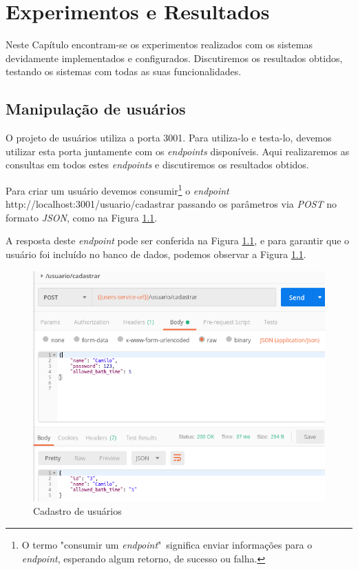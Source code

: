\chapter{Experimentos e Resultados}

Neste Capítulo encontram-se os experimentos realizados com os sistemas devidamente implementados e configurados. Discutiremos os resultados obtidos, testando os sistemas com todas as suas funcionalidades.

\section{Manipulação de usuários}

O projeto de usuários utiliza a porta 3001. Para utiliza-lo e testa-lo, devemos utilizar esta porta juntamente com os \textit{endpoints} disponíveis. Aqui realizaremos as consultas em todos estes \textit{endpoints} e discutiremos os resultados obtidos.

Para criar um usuário devemos consumir\footnote{O termo "consumir um \textit{endpoint}"\  significa enviar informações para o \textit{endpoint}, esperando algum retorno, de sucesso ou falha.} o \textit{endpoint} http://localhost:3001/usuario/cadastrar passando os parâmetros via \textit{POST} no formato \textit{JSON}, como na Figura \ref{fig:cadastro}.

A resposta deste \textit{endpoint} pode ser conferida na Figura \ref{fig:cadastro}, e para garantir que o usuário foi incluído no banco de dados, podemos observar a Figura \ref{fig:cadastro}.

\begin{figure}[htbp]
	\centering
	\includegraphics[width=0.7\linewidth]{figuras/postman/cadastro.png}
	\caption{Cadastro de usuários}
	\label{fig:cadastro}
\end{figure}


